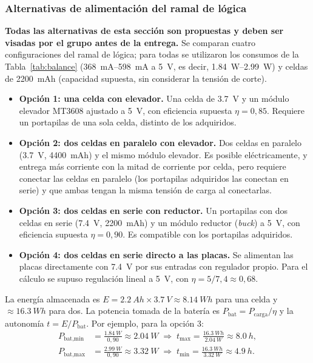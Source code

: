 \documentclass[12pt,a4paper]{article}
\begin{document}
\subsubsection{Alternativas de alimentación del ramal de lógica}
\begin{visar}
\textbf{Todas las alternativas de esta sección son propuestas y deben ser visadas por el grupo antes de la entrega.} Se comparan cuatro configuraciones del ramal de lógica; para todas se utilizaron los consumos de la Tabla~\ref{tab:balance} (\SI{368}{mA}--\SI{598}{mA} a \SI{5}{V}, es decir, \SI{1,84}{W}--\SI{2,99}{W}) y celdas de \SI{2200}{mAh} (capacidad supuesta, sin considerar la tensión de corte).

\begin{itemize}[nosep]
  \item \textbf{Opción 1: una celda con elevador.} Una celda de \SI{3,7}{V} y un módulo elevador MT3608 ajustado a \SI{5}{V}, con eficiencia supuesta $\eta = 0{,}85$. Requiere un portapilas de una sola celda, distinto de los adquiridos.
  \item \textbf{Opción 2: dos celdas en paralelo con elevador.} Dos celdas en paralelo (\SI{3,7}{V}, \SI{4400}{mAh}) y el mismo módulo elevador. Es posible eléctricamente, y entrega más corriente con la mitad de corriente por celda, pero requiere conectar las celdas en paralelo (los portapilas adquiridos las conectan en serie) y que ambas tengan la misma tensión de carga al conectarlas.
  \item \textbf{Opción 3: dos celdas en serie con reductor.} Un portapilas con dos celdas en serie (\SI{7,4}{V}, \SI{2200}{mAh}) y un módulo reductor (\emph{buck}) a \SI{5}{V}, con eficiencia supuesta $\eta = 0{,}90$. Es compatible con los portapilas adquiridos.
  \item \textbf{Opción 4: dos celdas en serie directo a las placas.} Se alimentan las placas directamente con \SI{7,4}{V} por sus entradas con regulador propio. Para el cálculo se supuso regulación lineal a \SI{5}{V}, con $\eta = 5/7{,}4 \approx 0{,}68$.
\end{itemize}

La energía almacenada es $E = \SI{2,2}{Ah} \times \SI{3,7}{V} \approx \SI{8,14}{Wh}$ para una celda y $\approx \SI{16,3}{Wh}$ para dos. La potencia tomada de la batería es $P_{\text{bat}} = P_{\text{carga}}/\eta$ y la autonomía $t = E/P_{\text{bat}}$. Por ejemplo, para la opción 3:
\begin{align*}
P_{\text{bat,min}} &= \frac{\SI{1,84}{W}}{0{,}90} \approx \SI{2,04}{W} \;\Rightarrow\; t_{\max} = \frac{\SI{16,3}{Wh}}{\SI{2,04}{W}} \approx \SI{8,0}{h},\\
P_{\text{bat,max}} &= \frac{\SI{2,99}{W}}{0{,}90} \approx \SI{3,32}{W} \;\Rightarrow\; t_{\min} = \frac{\SI{16,3}{Wh}}{\SI{3,32}{W}} \approx \SI{4,9}{h}.
\end{align*}
\end{visar}
\end{document}
